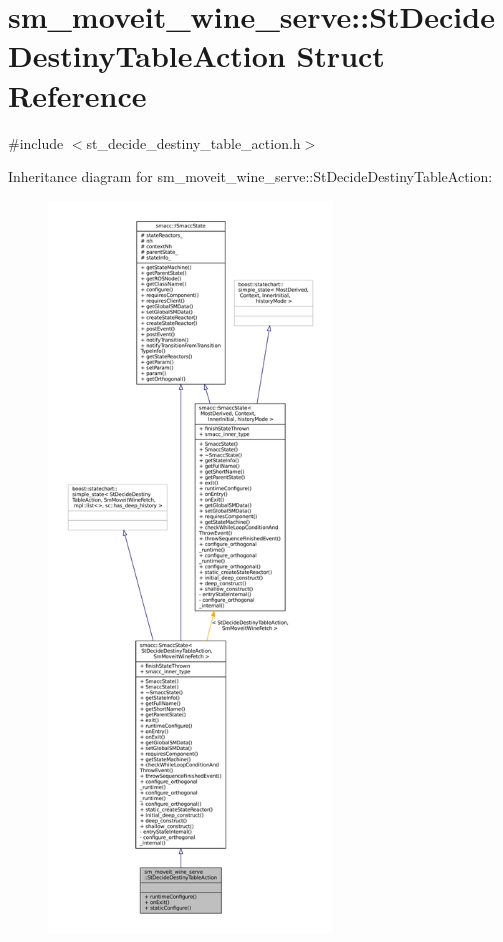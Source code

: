 \hypertarget{structsm__moveit__wine__serve_1_1StDecideDestinyTableAction}{}\section{sm\+\_\+moveit\+\_\+wine\+\_\+serve\+:\+:St\+Decide\+Destiny\+Table\+Action Struct Reference}
\label{structsm__moveit__wine__serve_1_1StDecideDestinyTableAction}


{\ttfamily \#include $<$st\+\_\+decide\+\_\+destiny\+\_\+table\+\_\+action.\+h$>$}



Inheritance diagram for sm\+\_\+moveit\+\_\+wine\+\_\+serve\+:\+:St\+Decide\+Destiny\+Table\+Action\+:
\nopagebreak
\begin{figure}[H]
\begin{center}
\leavevmode
\includegraphics[height=550pt]{structsm__moveit__wine__serve_1_1StDecideDestinyTableAction__inherit__graph}
\end{center}
\end{figure}


